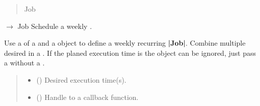 \documentclass[letterpaper,10pt,english]{sphinxmanual}
\begin{document}
\begin{fulllineitems}
\begin{fulllineitems}
\begin{quote}
\begin{description}
\sphinxAtStartPar
Job

\end{description}\end{quote}

\end{fulllineitems}


\begin{fulllineitems}
\label{\detokenize{index:scheduler.Scheduler.weekly}}
\pysigstartsignatures
\pysiglinewithargsret
{}
{\sphinxparamcomma {}\sphinxparamcomma {}}
{{ $\rightarrow$ Job}}
\pysigstopsignatures
\sphinxAtStartPar
Schedule a weekly .

\sphinxAtStartPar
Use a  of a  and a  object to define a weekly
recurring {\color{red}\bfseries{}|Job|}. Combine multiple desired  in
a . If the planed execution time is  the  object
can be ignored, just pass a  without a .
\begin{quote}\begin{description}
\begin{itemize}
\item {} 
\sphinxAtStartPar
{} () \textendash{} Desired execution time(s).

\item {} 
\sphinxAtStartPar
{} (\sphinxstyleliteralemphasis{\sphinxupquote{{[}}}\sphinxstyleliteralemphasis{\sphinxupquote{, }}\sphinxstyleliteralemphasis{\sphinxupquote{{]}}}) \textendash{} Handle to a callback function.


\end{itemize}
\end{description}
\end{quote}
\end{fulllineitems}
\end{fulllineitems}
\end{document}
